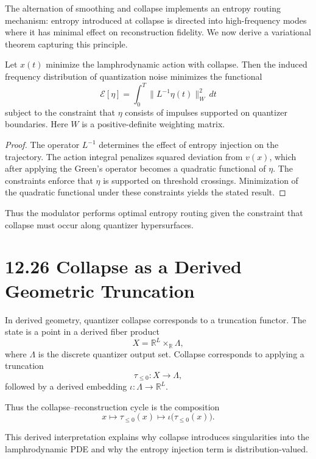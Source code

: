 The alternation of smoothing and collapse implements an entropy routing mechanism: entropy introduced at collapse is directed into high-frequency modes where it has minimal effect on reconstruction fidelity. We now derive a variational theorem capturing this principle.

\begin{theorem}
Let $x(t)$ minimize the lamphrodynamic action with collapse. Then the induced frequency distribution of quantization noise minimizes the functional
\[
\mathcal{E}[\eta] = 
\int_{0}^{T} 
\| L^{-1}\eta(t) \|_{W}^{2} \, dt
\]
subject to the constraint that $\eta$ consists of impulses supported on quantizer boundaries. Here $W$ is a positive-definite weighting matrix.
\end{theorem}

\begin{proof}
The operator $L^{-1}$ determines the effect of entropy injection on the trajectory. The action integral penalizes squared deviation from $v(x)$, which after applying the Green’s operator becomes a quadratic functional of $\eta$. The constraints enforce that $\eta$ is supported on threshold crossings. Minimization of the quadratic functional under these constraints yields the stated result.
\end{proof}

Thus the modulator performs optimal entropy routing given the constraint that collapse must occur along quantizer hypersurfaces.

\section*{12.26 Collapse as a Derived Geometric Truncation}

In derived geometry, quantizer collapse corresponds to a truncation functor. The state is a point in a derived fiber product
\[
X = \mathbb{R}^{L} \times_{\mathbb{R}} \Lambda,
\]
where $\Lambda$ is the discrete quantizer output set. Collapse corresponds to applying a truncation
\[
\tau_{\le 0} : X \to \Lambda,
\]
followed by a derived embedding $\iota : \Lambda \to \mathbb{R}^{L}$.

Thus the collapse--reconstruction cycle is the composition
\[
x \mapsto \tau_{\le 0}(x) \mapsto \iota\big(\tau_{\le 0}(x)\big).
\]

This derived interpretation explains why collapse introduces singularities into the lamphrodynamic PDE and why the entropy injection term is distribution-valued.

